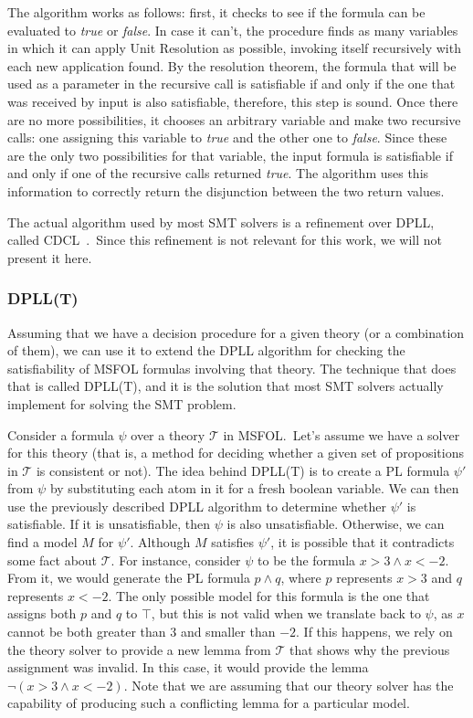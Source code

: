 The algorithm works as follows: first, it checks to see if the formula can be evaluated to \textit{true} or \textit{false}. In case it can't, the procedure finds as many variables in which it can apply Unit Resolution as possible, invoking itself recursively with each new application found. By the resolution theorem, the formula that will be used as a parameter in the recursive call is satisfiable if and only if the one that was received by input is also satisfiable, therefore, this step is sound. Once there are no more possibilities, it chooses an arbitrary variable and make two recursive calls: one assigning this variable to \textit{true} and the other one to \textit{false}. Since these are the only two possibilities for that variable, the input formula is satisfiable if and only if one of the recursive calls returned \textit{true}. The algorithm uses this information to correctly return the disjunction between the two return values.

The actual algorithm used by most SMT solvers is a refinement over DPLL, called CDCL~\cite{cdcl}.\ Since this refinement is not relevant for this work, we will not present it here.

\subsubsection{DPLL(T)}

Assuming that we have a decision procedure for a given theory (or a combination of them), we can use it to extend the DPLL algorithm for checking the satisfiability of MSFOL formulas involving that theory. The technique that does that is called DPLL(T), and it is the solution that most SMT solvers actually implement for solving the SMT problem.

Consider a formula $\psi$ over a theory $\mathcal{T}$ in MSFOL.\ Let's assume we have a solver for this theory (that is, a method for deciding whether a given set of propositions in $\mathcal{T}$ is consistent or not). The idea behind DPLL(T) is to create a PL formula $\psi'$ from $\psi$ by substituting each atom in it for a fresh boolean variable. We can then use the previously described DPLL algorithm to determine whether $\psi'$ is satisfiable. If it is unsatisfiable, then $\psi$ is also unsatisfiable. Otherwise, we can find a model $M$ for $\psi'$. Although $M$ satisfies $\psi'$, it is possible that it contradicts some fact about $\mathcal{T}$. For instance, consider $\psi$ to be the formula $x > 3 \wedge x < -2$. From it, we would generate the PL formula $p \wedge q$, where $p$ represents $x > 3$ and $q$ represents $x < -2$. The only possible model for this formula is the one that assigns both $p$ and $q$ to $\top$, but this is not valid when we translate back to $\psi$, as $x$ cannot be both greater than $3$ and smaller than $-2$. If this happens, we rely on the theory solver to provide a new lemma from $\mathcal{T}$ that shows why the previous assignment was invalid. In this case, it would provide the lemma $\neg (x > 3 \wedge x < -2)$. Note that we are assuming that our theory solver has the capability of producing such a conflicting lemma for a particular model.

